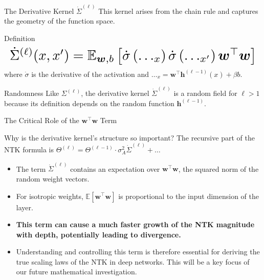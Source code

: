 \documentclass{beamer}
\begin{document}
\begin{frame}{The Derivative Kernel $\dot{\Sigma}^{(\ell)}$}
This kernel arises from the chain rule and captures the geometry of the function space.
\begin{block}{Definition}
\begin{equation*}
\resizebox{\hsize}{!}{$
\dot{\Sigma}^{(\ell)}(x, x') = \mathbb{E}_{\bm{w}, b} \left[ \dot{\sigma}\left(\dots_x\right) \dot{\sigma}\left(\dots_{x'}\right) \bm{w}^\top\bm{w} \right]
$}
\end{equation*}
where $\dot{\sigma}$ is the derivative of the activation and $\dots_x = \bm{w}^\top \bm{h}^{(\ell-1)}(x) + \beta b$.
\end{block}
\begin{alertblock}{Randomness}
Like $\Sigma^{(\ell)}$, the derivative kernel $\dot{\Sigma}^{(\ell)}$ is a random field for $\ell > 1$ because its definition depends on the random function $\bm{h}^{(\ell-1)}$.
\end{alertblock}
\end{frame}

\begin{frame}{The Critical Role of the $\bm{w}^\top\bm{w}$ Term}
\begin{block}{Why is the derivative kernel's structure so important?}
The recursive part of the NTK formula is $\Theta^{(\ell)} = \Theta^{(\ell-1)} \cdot \sigma_A^2 \dot{\Sigma}^{(\ell)} + \dots$
\end{block}
\begin{itemize}
    \item The term $\dot{\Sigma}^{(\ell)}$ contains an expectation over $\bm{w}^\top\bm{w}$, the squared norm of the random weight vectors.
    \item For isotropic weights, $\mathbb{E}[\bm{w}^\top\bm{w}]$ is proportional to the input dimension of the layer.
    \item \textbf{This term can cause a much faster growth of the NTK magnitude with depth, potentially leading to divergence.}
    \item Understanding and controlling this term is therefore essential for deriving the true scaling laws of the NTK in deep networks. This will be a key focus of our future mathematical investigation.
\end{itemize}
\end{frame}
\end{document}
